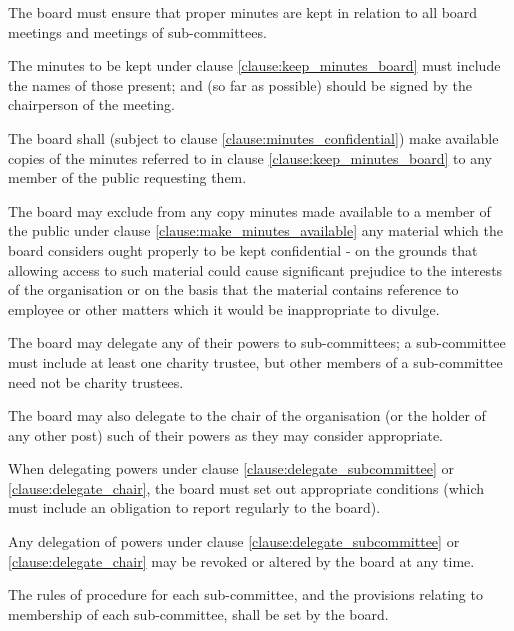 ﻿\documentclass[a4paper,11pt,onecolumn ]{article}
\begin{document}
\begin{legal}
\item \label{clause:keep_minutes_board} The board must ensure that proper minutes are kept in relation to all board meetings and meetings of sub-committees.
\item The minutes to be kept under clause \ref{clause:keep_minutes_board} must include the names of those present; and (so far as possible) should be signed by the chairperson of the meeting.
\item \label{clause:make_minutes_available} The board shall (subject to clause \ref{clause:minutes_confidential}) make available copies of the minutes referred to in clause \ref{clause:keep_minutes_board} to any member of the public requesting them.
\item \label{clause:minutes_confidential} The board may exclude from any copy minutes made available to a member of the public under clause \ref{clause:make_minutes_available} any material which the board considers ought properly to be kept confidential - on the grounds that allowing access to such material could cause significant prejudice to the interests of the organisation or on the basis that the material contains reference to employee or other matters which it would be inappropriate to divulge.
\end{legal}

\begin{legal}
\item \label{clause:delegate_subcommittee} The board may delegate any of their powers to sub-committees; a sub-committee must include at least one charity trustee, but other members of a sub-committee need not be charity trustees.
\item \label{clause:delegate_chair} The board may also delegate to the chair of the organisation (or the holder of any other post) such of their powers as they may consider appropriate.
\item When delegating powers under clause \ref{clause:delegate_subcommittee} or \ref{clause:delegate_chair}, the board must set out appropriate conditions (which must include an obligation to report regularly to the board).

\item Any delegation of powers under clause \ref{clause:delegate_subcommittee} or \ref{clause:delegate_chair} may be revoked or altered by the board at any time.
\item The rules of procedure for each sub-committee, and the provisions relating to membership of each sub-committee, shall be set by the board.
\end{legal}
\end{document}
